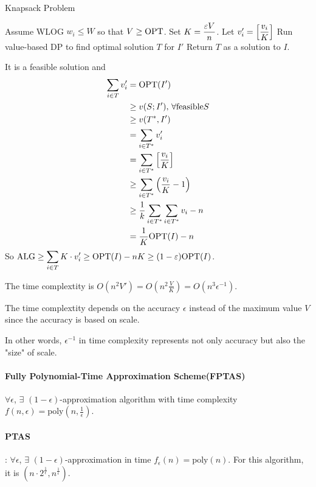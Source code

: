 \begin{example}
    \begin{algorithm}
        \caption{Knapsack Problem}
        \begin{algorithmic}[1]
            \STATE Assume WLOG  $ w_i \leq W $ so that  $ V \geq \mathrm{OPT} $.
            \STATE Set  $ K=\displaystyle\frac{\varepsilon V}{n} $. Let  $ v_i'=\left[\displaystyle\frac{v_i}{K}\right] $
            \STATE Run value-based DP to find optimal solution  $ T $ for  $ I' $ 
            \STATE Return  $ T $ as a solution to  $ I $.       
        \end{algorithmic}
    \end{algorithm}
    It is a feasible solution and 
    \begin{align*}
        \sum_{i\in T}v_i'&=\mathrm{OPT}(I')\\
        & \geq v(S;I'),\,\forall \text{feasible} S\\
        & \geq v(T^*,I')\\
        &=\sum_{i\in T^*}v_i'\\
        &=\sum_{i\in T^*}\left[\frac{v_i}{K}\right]\\
        & \geq \sum_{i\in T^*}\left(\frac{v_i}{K}-1\right)\\
        & \geq \frac{1}{k}\sum_{i\in T^*}\sum_{i\in T^*}v_i-n\\
        &=\frac{1}{K}\mathrm{OPT}(I)-n
    \end{align*}
    So  $ \mathrm{ALG} \geq \displaystyle\sum_{i\in T}K\cdot v_i' \geq \mathrm{OPT}(I)-nK \geq (1-\varepsilon)\mathrm{OPT}(I) $. 

    The time complextity is  $ O(n^2V')=O(n^2\frac{V}{K})=O(n^3\epsilon^{-1}) $.
    
    \begin{remark}
        The time complextity depends on the accuracy  $ \epsilon $ instead of the maximum value  $ V $ since the accuracy is based on scale.
        
        In other words,  $ \epsilon^{-1} $ in time complexity represents not only accuracy but also the "size" of scale. 
    \end{remark}

    \paragraph{Fully Polynomial-Time Approximation Scheme(FPTAS)}
     $ \forall \epsilon $,  $ \exists  $ $ (1-\epsilon) $-approximation algorithm with time complexity  $ f(n,\epsilon)=\mathrm{poly}(n,\frac{1}{\epsilon}) $.
    
    \paragraph{PTAS}:  $ \forall \epsilon $,  $ \exists $   $ (1-\epsilon) $-approximation in time  $ f_\epsilon(n)=\mathrm{poly}(n) $. For this algorithm, it is   $ (n\cdot 2^{\frac{1}{\epsilon}},n^{\frac{1}{\epsilon}})$.

\end{example}


